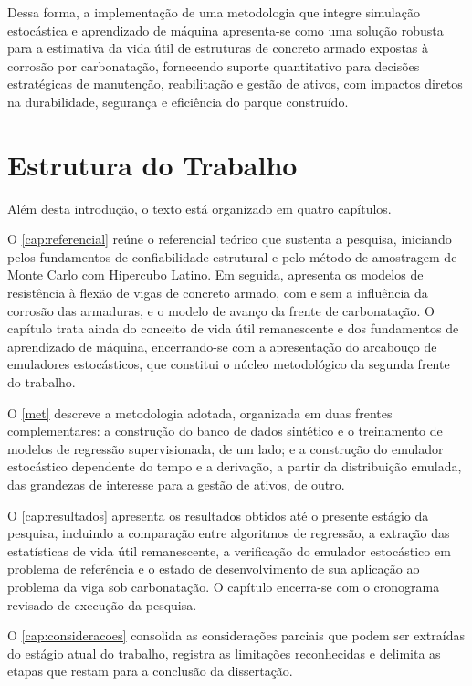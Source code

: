 Dessa forma, a implementação de uma metodologia que integre simulação estocástica e aprendizado de máquina apresenta-se como uma solução robusta para a estimativa da vida útil de estruturas de concreto armado expostas à corrosão por carbonatação, fornecendo suporte quantitativo para decisões estratégicas de manutenção, reabilitação e gestão de ativos, com impactos diretos na durabilidade, segurança e eficiência do parque construído.

\section{Estrutura do Trabalho}

Além desta introdução, o texto está organizado em quatro capítulos.

O \autoref{cap:referencial} reúne o referencial teórico que sustenta a pesquisa, iniciando pelos fundamentos de confiabilidade estrutural e pelo método de amostragem de Monte Carlo com Hipercubo Latino. Em seguida, apresenta os modelos de resistência à flexão de vigas de concreto armado, com e sem a influência da corrosão das armaduras, e o modelo de avanço da frente de carbonatação. O capítulo trata ainda do conceito de vida útil remanescente e dos fundamentos de aprendizado de máquina, encerrando-se com a apresentação do arcabouço de emuladores estocásticos, que constitui o núcleo metodológico da segunda frente do trabalho.

O \autoref{met} descreve a metodologia adotada, organizada em duas frentes complementares: a construção do banco de dados sintético e o treinamento de modelos de regressão supervisionada, de um lado; e a construção do emulador estocástico dependente do tempo e a derivação, a partir da distribuição emulada, das grandezas de interesse para a gestão de ativos, de outro.

O \autoref{cap:resultados} apresenta os resultados obtidos até o presente estágio da pesquisa, incluindo a comparação entre algoritmos de regressão, a extração das estatísticas de vida útil remanescente, a verificação do emulador estocástico em problema de referência e o estado de desenvolvimento de sua aplicação ao problema da viga sob carbonatação. O capítulo encerra-se com o cronograma revisado de execução da pesquisa.

O \autoref{cap:consideracoes} consolida as considerações parciais que podem ser extraídas do estágio atual do trabalho, registra as limitações reconhecidas e delimita as etapas que restam para a conclusão da dissertação.
